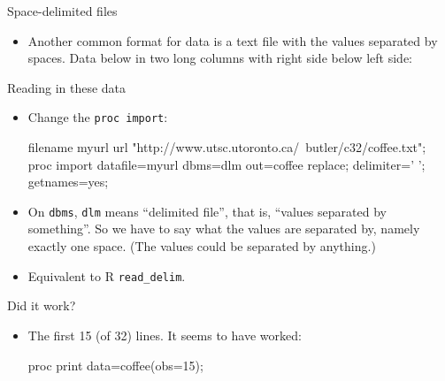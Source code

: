 \documentclass[unknownkeysallowed]{beamer}\usepackage[]{graphicx}\usepackage[]{color}
\begin{document}
\begin{frame}[fragile]{Space-delimited files}
  
  \begin{itemize}
  \item Another common format for data is a text file with the values
    separated by spaces. Data below in two long columns with right
    side below left side:
    
    \begin{footnotesize}
    \begin{multicols}{2}
      
    \end{multicols}
      
    \end{footnotesize}
    
  \end{itemize}
  
\end{frame}

\begin{frame}[fragile]{Reading in these data}
  
  \begin{itemize}
  \item Change the \texttt{proc import}:
    
    \begin{Datastep}
filename myurl url 
  "http://www.utsc.utoronto.ca/~butler/c32/coffee.txt";      
proc import 
  datafile=myurl
  dbms=dlm
  out=coffee
  replace;
  delimiter=' ';
  getnames=yes;
    \end{Datastep}
  \item On \texttt{dbms}, \texttt{dlm} means ``delimited file'', that
    is, ``values separated by something''. So we have to say what the
    values are separated by, namely exactly one space. (The values
    could be separated by anything.) 
  \item Equivalent to R \texttt{read\_delim}.
  \end{itemize}
  
\end{frame}

\begin{frame}[fragile]{Did it work?}
  
  \begin{itemize}
  \item The first 15 (of 32) lines. It seems to have worked:
    
    \begin{Sascode}[store=rc]
proc print data=coffee(obs=15);      
    \end{Sascode}
    
  \end{itemize}
  
\end{frame}
\end{document}
